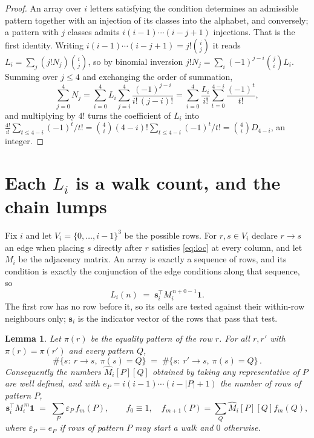 \documentclass[11pt,a4paper]{article}
\theoremstyle{plain}
\newtheorem{lemma}[theorem]{Lemma}
\theoremstyle{definition}
\begin{document}
\begin{proof}
An array over $i$ letters satisfying the condition determines an admissible pattern together
with an injection of its classes into the alphabet, and conversely; a pattern with $j$
classes admits $i(i-1)\cdots(i-j+1)$ injections. That is the first identity. Writing
$i(i-1)\cdots(i-j+1)=j!\binom{i}{j}$ it reads $L_i=\sum_j (j!N_j)\binom{i}{j}$, so by
binomial inversion $j!N_j=\sum_{i}(-1)^{j-i}\binom{j}{i}L_i$. Summing over
$j\le 4$ and exchanging the order of summation,
\[
\sum_{j=0}^{4}N_j=\sum_{i=0}^{4}L_i\sum_{j=i}^{4}\frac{(-1)^{j-i}}{i!\,(j-i)!}
=\sum_{i=0}^{4}\frac{L_i}{i!}\sum_{t=0}^{4-i}\frac{(-1)^t}{t!} ,
\]
and multiplying by $4!$ turns the coefficient of $L_i$ into
$\frac{4!}{i!}\sum_{t\le 4-i}(-1)^t/t!=\binom{4}{i}(4-i)!\sum_{t\le 4-i}(-1)^t/t!
=\binom{4}{i}D_{4-i}$, an integer.
\end{proof}

\section{Each $L_i$ is a walk count, and the chain lumps}

Fix $i$ and let $V_i=\{0,\dots,i-1\}^{3}$ be the possible rows. For $r,s\in V_i$
declare $r\to s$ an edge when placing $s$ directly after $r$ satisfies \eqref{eq:loc} at
every column, and let $M_i$ be the adjacency matrix. An array is exactly a sequence of
rows, and its condition is exactly the conjunction of the edge conditions along that
sequence, so
\[
L_i(n)\;=\;\mathbf{s}_i^{\!\top}M_i^{\,n+0-1}\mathbf{1} .
\]
The first row has no row before it, so its cells are tested
against their within-row neighbours only; $\mathbf{s}_i$ is the indicator vector of the
rows that pass that test.

\begin{lemma}\label{lem:lump}
Let $\pi(r)$ be the equality pattern of the row $r$. For all $r,r'$ with
$\pi(r)=\pi(r')$ and every pattern $Q$,
\[
\#\{s:\ r\to s,\ \pi(s)=Q\}\;=\;\#\{s:\ r'\to s,\ \pi(s)=Q\}\, .
\]
Consequently the numbers $\widehat M_i[P][Q]$ obtained by taking any representative of $P$
are well defined, and with $e_P=i(i-1)\cdots(i-|P|+1)$ the number of rows of pattern $P$,
\[
\mathbf{s}_i^{\!\top}M_i^{\,m}\mathbf{1}\;=\;\sum_P \varepsilon_P\,f_m(P),
\qquad f_0\equiv1,\quad f_{m+1}(P)=\sum_Q\widehat M_i[P][Q]f_m(Q),
\]
where $\varepsilon_P=e_P$ if rows of pattern $P$ may start a walk and $0$ otherwise.
\end{lemma}
\end{document}
